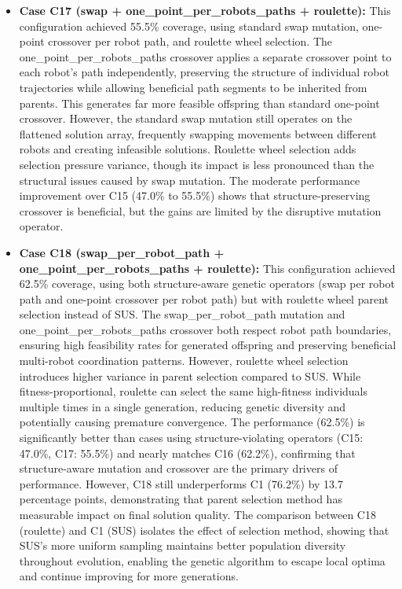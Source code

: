 \begin{itemize}
    \item \textbf{Case C17 (swap + one\_point\_per\_robots\_paths + roulette):}
    This configuration achieved 55.5\% coverage, using standard swap mutation, one-point crossover per robot path, and roulette wheel selection.
    The one\_point\_per\_robots\_paths crossover applies a separate crossover point to each robot's path independently, preserving the structure of individual robot trajectories while allowing beneficial path segments to be inherited from parents. This generates far more feasible offspring than standard one-point crossover.
    However, the standard swap mutation still operates on the flattened solution array, frequently swapping movements between different robots and creating infeasible solutions.
    Roulette wheel selection adds selection pressure variance, though its impact is less pronounced than the structural issues caused by swap mutation.
    The moderate performance improvement over C15 (47.0\% to 55.5\%) shows that structure-preserving crossover is beneficial, but the gains are limited by the disruptive mutation operator.

    \item \textbf{Case C18 (swap\_per\_robot\_path + one\_point\_per\_robots\_paths + roulette):}
    This configuration achieved 62.5\% coverage, using both structure-aware genetic operators (swap per robot path and one-point crossover per robot path) but with roulette wheel parent selection instead of SUS.
    The swap\_per\_robot\_path mutation and \\ one\_point\_per\_robots\_paths crossover both respect robot path boundaries, ensuring high feasibility rates for generated offspring and preserving beneficial multi-robot coordination patterns.
    However, roulette wheel selection introduces higher variance in parent selection compared to SUS. While fitness-proportional, roulette can select the same high-fitness individuals multiple times in a single generation, reducing genetic diversity and potentially causing premature convergence.
    The performance (62.5\%) is significantly better than cases using structure-violating operators (C15: 47.0\%, C17: 55.5\%) and nearly matches C16 (62.2\%), confirming that structure-aware mutation and crossover are the primary drivers of performance.
    However, C18 still underperforms C1 (76.2\%) by 13.7 percentage points, demonstrating that parent selection method has measurable impact on final solution quality.
    The comparison between C18 (roulette) and C1 (SUS) isolates the effect of selection method, showing that SUS's more uniform sampling maintains better population diversity throughout evolution, enabling the genetic algorithm to escape local optima and continue improving for more generations.


\end{itemize}
